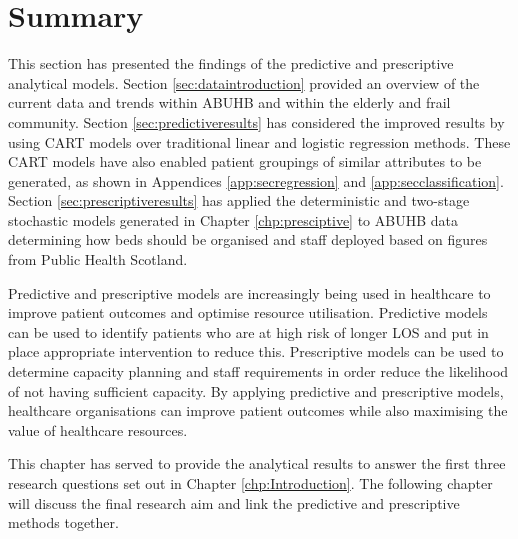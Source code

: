 \documentclass[../thesis.tex]{subfiles}
\begin{document}
\section{Summary}
This section has presented the findings of the predictive and prescriptive analytical models. Section \ref{sec:dataintroduction} provided an overview of the current data and trends within ABUHB and within the elderly and frail community. Section \ref{sec:predictiveresults} has considered the improved results by using CART models over traditional linear and logistic regression methods. These CART models have also enabled patient groupings of similar attributes to be generated, as shown in Appendices \ref{app:secregression} and \ref{app:secclassification}. Section \ref{sec:prescriptiveresults} has applied the deterministic and two-stage stochastic models generated in Chapter \ref{chp:presciptive} to ABUHB data determining how beds should be organised and staff deployed based on figures from Public Health Scotland.

Predictive and prescriptive models are increasingly being used in healthcare to improve patient outcomes and optimise resource utilisation. Predictive models can be used to identify patients who are at high risk of longer LOS and put in place appropriate intervention to reduce this. Prescriptive models can be used to determine capacity planning and staff requirements in order reduce the likelihood of not having sufficient capacity. By applying predictive and prescriptive models, healthcare organisations can improve patient outcomes while also maximising the value of healthcare resources.

This chapter has served to provide the analytical results to answer the first three research questions set out in Chapter \ref{chp:Introduction}. The following chapter will discuss the final research aim and link the predictive and prescriptive methods together.
\end{document}
